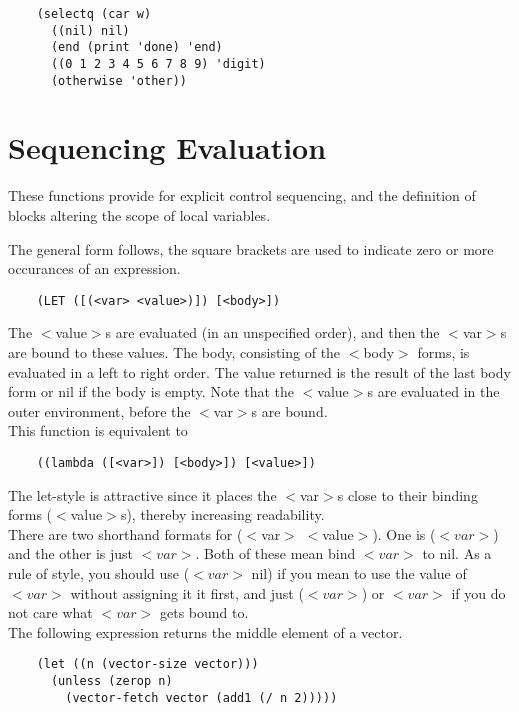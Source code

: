 \begin{verbatim}
    (selectq (car w)
      ((nil) nil)
      (end (print 'done) 'end)
      ((0 1 2 3 4 5 6 7 8 9) 'digit)
      (otherwise 'other))
\end{verbatim}
\section{Sequencing Evaluation}

  These functions  provide  for  explicit control    sequencing,
and    the  definition  of  blocks  altering  the scope of local
variables.


{    The general form follows, the square brackets  are  used  to
    indicate zero or more occurances of an expression.
}
\begin{verbatim}
    (LET ([(<var> <value>)]) [<body>])
\end{verbatim}
    The  $<$value$>$s  are  evaluated (in an unspecified order), and
    then the $<$var$>$s are  bound  to  these  values. The  body,
    consisting  of the $<$body$>$ forms, is evaluated in a left to
    right order. The value returned is the result of the last
    body  form  or  nil  if  the  body  is empty.  Note that the
    $<$value$>$s are evaluated in the outer environment, before  the
    $<$var$>$s are bound.\\

    This function is equivalent to

\begin{verbatim}
    ((lambda ([<var>]) [<body>]) [<value>])
\end{verbatim}
    The let-style is attractive since it places the $<$var$>$s close
    to   their  binding  forms  ($<$value$>$s),  thereby  increasing
    readability.\\

There are two shorthand formats for ($<$var$>$ $<$value$>$). One
is ($<var>$) and the other is just $<var>$.   Both  of  these  mean
bind  $<var>$  to  nil. As  a rule of style, you should use ($<var>$ nil)
if you mean to use the value  of  $<var>$  without
assigning  it  it first, and just ($<var>$) or $<var>$ if you do
not care what $<var>$ gets bound to.\\

The following expression returns the middle element of a vector.

\begin{verbatim}
    (let ((n (vector-size vector)))
      (unless (zerop n)
        (vector-fetch vector (add1 (/ n 2)))))
\end{verbatim}

